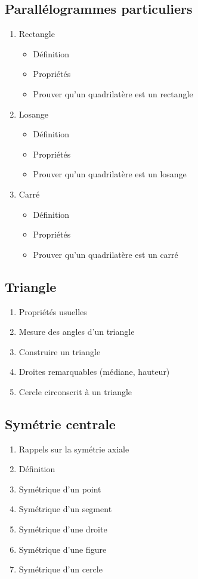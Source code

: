 \subsection{Parallélogrammes particuliers}\label{ch_5_para2}
\begin{enumerate}
	\item Rectangle
		\begin{itemize}
			\item Définition
			\item Propriétés
			\item Prouver qu'un quadrilatère est un rectangle
		\end{itemize}
	\item Losange
		\begin{itemize}
			\item Définition
			\item Propriétés
			\item Prouver qu'un quadrilatère est un losange
		\end{itemize}
	\item Carré
		\begin{itemize}
			\item Définition
			\item Propriétés
			\item Prouver qu'un quadrilatère est un carré
		\end{itemize}
\end{enumerate}

\subsection{Triangle}\label{ch_5_tri}
	\begin{enumerate}
		\item Propriétés usuelles
		\item Mesure des angles d'un triangle
		\item Construire un triangle
		\item Droites remarquables (médiane, hauteur)
		\item Cercle circonscrit à un triangle
	\end{enumerate}
	
\subsection{Symétrie centrale}\label{ch_5_sym}	
\begin{enumerate}
	\item Rappels sur la symétrie axiale
	\item Définition
	\item Symétrique d'un point
	\item Symétrique d'un segment
	\item Symétrique d'une droite
	\item Symétrique d'une figure
	\item Symétrique d'un cercle
\end{enumerate}

